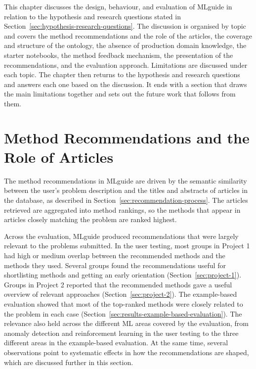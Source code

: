 \label{ch:discussion}

This chapter discusses the design, behaviour, and evaluation of 
MLguide in relation to the hypothesis and research questions stated in 
Section~\ref{sec:hypothesis-research-questions}. 
The discussion is organised by topic 
and covers the method recommendations and the role of the articles, 
the coverage and structure of the ontology, 
the absence of production domain knowledge, the starter notebooks, the 
method feedback mechanism, the presentation of the recommendations, 
and the evaluation approach. Limitations are discussed under each 
topic. The chapter then returns to the hypothesis 
and research questions and answers each one based on the discussion. 
It ends with a section that draws the main limitations together and 
sets out the future work that follows from them.

\section{Method Recommendations and the Role of Articles}
\label{sec:method-recommendations-and-role-of-articles}

The method recommendations in MLguide are driven by the 
semantic similarity between the user's problem description and 
the titles and abstracts of articles in the database, as 
described in Section~\ref{sec:recommendation-process}. The 
articles retrieved are aggregated into method rankings, 
so the methods that appear in articles closely matching the 
problem are ranked highest. 

Across the evaluation, MLguide produced recommendations that 
were largely relevant to the problems submitted. In the user 
testing, most groups in Project 1 had high or medium overlap 
between the recommended methods and the methods they used.
Several groups found the recommendations useful for shortlisting
methods and getting an early orientation
(Section~\ref{sec:project-1}). Groups in Project 2 reported 
that the recommended methods gave a useful overview of 
relevant approaches (Section~\ref{sec:project-2}). The 
example-based evaluation showed that most of the top-ranked 
methods were closely related to the problem in each case 
(Section~\ref{sec:results-example-based-evaluation}). 
The relevance also held across the different ML areas covered by the
evaluation, from anomaly detection and reinforcement learning in
the user testing to the three different areas in the example-based
evaluation.
At the 
same time, several observations point to systematic effects 
in how the recommendations are shaped, which are discussed 
further in this section.

